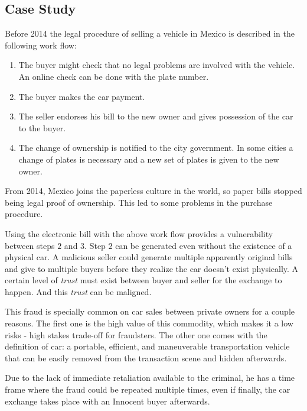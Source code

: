 \subsection{Case Study}
Before 2014 the legal procedure of selling a vehicle in Mexico is described in the following
work flow:
\begin{enumerate}
    \item The buyer might check that no legal problems are involved with the vehicle. 
          An online check can be done with the plate number. 
    \item The buyer makes the car payment.
    \item The seller endorses his bill to the new owner and gives possession of the car 
    to the buyer.
    \item The change of ownership is notified to the city government. In some cities a 
        change of plates is necessary and a new set of plates is given to the new owner.
\end{enumerate}

From 2014, Mexico joins the paperless culture in the world, so paper bills stopped being 
legal proof of ownership. This led to some problems in the purchase procedure.

Using the electronic bill with the above work flow provides a vulnerability between steps $2$ and $3$. 
Step $2$ can be generated even without the existence of a physical car. A malicious seller 
could generate multiple apparently original bills and give to multiple buyers before 
they realize the car doesn't exist physically. A certain level of \textit{trust} must 
exist between buyer and seller for the exchange to happen. And this \textit{trust} can be 
maligned. 

This fraud is specially common on car sales between private owners for a couple reasons. 
The first one is the high value of this commodity, which makes it a low risks - high stakes 
trade-off for fraudsters. The other one comes with the definition of car: a portable, efficient, 
and maneuverable transportation vehicle that can be easily removed from the transaction scene 
and hidden afterwards.

Due to the lack of immediate retaliation available to the criminal, he has a time frame where 
the fraud could be repeated multiple times, even if finally, the car exchange takes place with 
an Innocent buyer afterwards.

